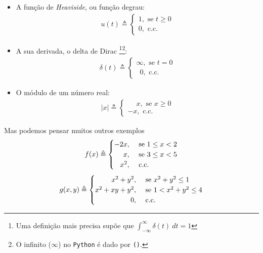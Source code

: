 \documentclass[12pt]{article}
\begin{document}
\begin{itemize}

	\item[] A função de \textit{Heaviside}, ou função degrau:
	\begin{align*}
		u(t) \triangleq	\begin{cases}
		1, \text{ se } t \geq 0\\
		0, \text{ c.c.}
		\end{cases}
	\end{align*}
	
	\item[] A sua derivada, o delta de Dirac \footnote{Uma definição mais precisa supõe que $\displaystyle \int_{-\infty}^{\infty} \delta(t)\ dt = 1$}\footnote{O infinito ($\infty$) no \texttt{Python} é dado por \texttt{()}.}:
	\begin{align*}
		\delta(t) \triangleq	\begin{cases}
		\infty, \text{ se } t = 0\\
		\phantom{0}0, \text{ c.c.}
		\end{cases}
	\end{align*}
	
	\item[] O módulo de um número real:
	\begin{align*}
		|x| \triangleq	\begin{cases}
		\phantom{-}x, \text{ se } x \geq 0\\
		-x, \text{ c.c.}
		\end{cases}
	\end{align*}	
\end{itemize}
	
	Mas podemos pensar muitos outros exemplos
	\begin{align*}
		f(x) \triangleq	\begin{cases}
		\hfill -2x,& \text{ se } 1 \leq x < 2\\ 
		\hfill x,& \text{ se } 3 \leq x < 5\\
		\hfill x^2,& \text{ c.c.}
		\end{cases}
	\end{align*}
	\begin{align*}
		g(x, y) \triangleq	\begin{cases}
		\hfill x^2 + y^2,& \text{ se } x^2 + y^2 \leq 1\\
		\hfill x^2 + xy + y^2,& \text{ se } 1 < x^2 + y^2 \leq 4\\
		\hfill 0,& \text{ c.c.}\\
		\end{cases}
	\end{align*}
\end{document}
